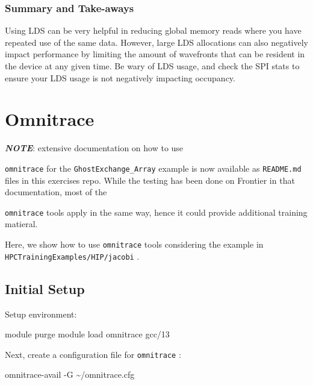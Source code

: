\documentclass[
]{article}
\let\oldtexttt\texttt
\renewcommand{\texttt}[1]{
  \colorbox{Light}{\oldtexttt{#1}}
}
\newenvironment{Shaded}{}{}
\newcommand{\ExtensionTok}[1]{#1}
\newcommand{\NormalTok}[1]{#1}
\begin{document}
\hypertarget{summary-and-take-aways2}{%
\subsubsection{Summary and Take-aways}\label{summary-and-take-aways2}}

Using LDS can be very helpful in reducing global memory reads where you
have repeated use of the same data. However, large LDS allocations can
also negatively impact performance by limiting the amount of wavefronts
that can be resident in the device at any given time. Be wary of LDS
usage, and check the SPI stats to ensure your LDS usage is not
negatively impacting occupancy.

\pagebreak

\hypertarget{omnitrace}{%
\section{Omnitrace}\label{omnitrace}}

\textbf{\emph{NOTE}}: extensive documentation on how to use
\texttt{omnitrace} for the \texttt{GhostExchange\_Array} example is now
available as \texttt{README.md} files in this exercises repo. While the
testing has been done on Frontier in that documentation, most of the
\texttt{omnitrace} tools apply in the same way, hence it could provide
additional training matieral.

Here, we show how to use \texttt{omnitrace} tools considering the
example in \texttt{HPCTrainingExamples/HIP/jacobi}.

\hypertarget{initial-setup2}{%
\subsection{Initial Setup}\label{initial-setup2}}

Setup environment:

\begin{Shaded}
\begin{Highlighting}[]
\ExtensionTok{module}\NormalTok{ purge}
\ExtensionTok{module}\NormalTok{ load omnitrace gcc/13}
\end{Highlighting}
\end{Shaded}

Next, create a configuration file for \texttt{omnitrace}:

\begin{Shaded}
\begin{Highlighting}[]
\ExtensionTok{omnitrace{-}avail}\NormalTok{ {-}G \textasciitilde{}/omnitrace.cfg}
\end{Highlighting}
\end{Shaded}
\end{document}
